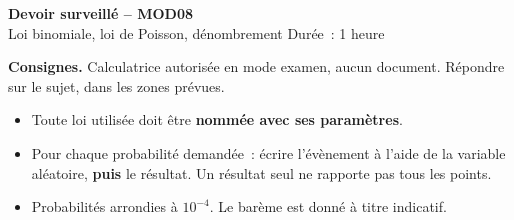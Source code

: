\documentclass[a4paper,11pt]{article}
\begin{document}
\begin{tcolorbox}[colback=uimmred, colframe=uimmred, sharp corners, boxrule=0pt,
  left=14pt, right=14pt, top=10pt, bottom=10pt]
{\color{white}\LARGE\bfseries Devoir surveillé -- MOD08}\\[4pt]
{\color{white}\large Loi binomiale, loi de Poisson, dénombrement \hfill Durée~: 1 heure}
\end{tcolorbox}

\vspace{2pt}

\begin{consigne}
\textbf{Consignes.} Calculatrice autorisée en mode examen, aucun document. Répondre sur le sujet, dans les zones prévues.
\begin{itemize}[leftmargin=12pt, itemsep=1pt, topsep=2pt]
  \item Toute loi utilisée doit être \textbf{nommée avec ses paramètres}.
  \item Pour chaque probabilité demandée~: écrire l'évènement à l'aide de la variable aléatoire, \textbf{puis} le résultat. Un résultat seul ne rapporte pas tous les points.
  \item Probabilités arrondies à $10^{-4}$. Le barème est donné à titre indicatif.
\end{itemize}
\end{consigne}
\end{document}
